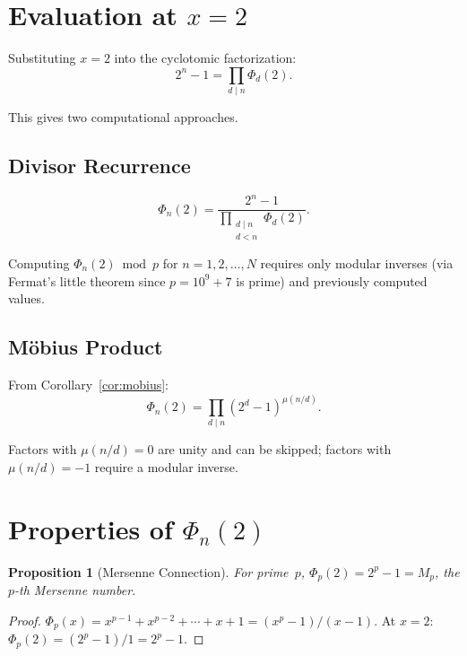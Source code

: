 \documentclass[11pt]{article}
\newtheorem{proposition}[theorem]{Proposition}
\begin{document}
\section{Evaluation at $x = 2$}

Substituting $x = 2$ into the cyclotomic factorization:
\[
2^n - 1 = \prod_{d \mid n} \Phi_d(2).
\]

This gives two computational approaches.

\subsection{Divisor Recurrence}

\begin{equation}\label{eq:recurrence}
\Phi_n(2) = \frac{2^n - 1}{\displaystyle\prod_{\substack{d \mid n \\ d < n}} \Phi_d(2)}.
\end{equation}

Computing $\Phi_n(2) \bmod p$ for $n = 1, 2, \ldots, N$ requires only modular inverses (via Fermat's little theorem since $p = 10^9 + 7$ is prime) and previously computed values.

\subsection{M\"obius Product}

From Corollary~\ref{cor:mobius}:
\begin{equation}\label{eq:mobius}
\Phi_n(2) = \prod_{d \mid n} (2^d - 1)^{\mu(n/d)}.
\end{equation}

Factors with $\mu(n/d) = 0$ are unity and can be skipped; factors with $\mu(n/d) = -1$ require a modular inverse.

\section{Properties of $\Phi_n(2)$}

\begin{proposition}[Mersenne Connection]
For prime~$p$, $\Phi_p(2) = 2^p - 1 = M_p$, the $p$-th Mersenne number.
\end{proposition}

\begin{proof}
$\Phi_p(x) = x^{p-1} + x^{p-2} + \cdots + x + 1 = (x^p - 1)/(x - 1)$. At $x = 2$: $\Phi_p(2) = (2^p - 1)/1 = 2^p - 1$.
\end{proof}
\end{document}
